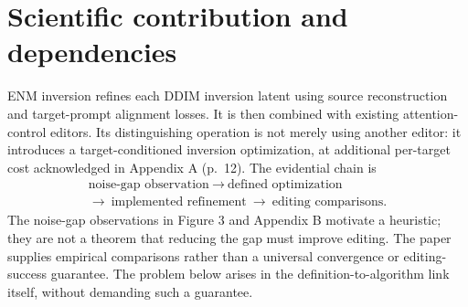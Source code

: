 \documentclass[10pt]{article}
\begin{document}
\section*{Scientific contribution and dependencies}
ENM inversion refines each DDIM inversion latent using source reconstruction and target-prompt alignment losses. It is then combined with existing attention-control editors. Its distinguishing operation is not merely using another editor: it introduces a target-conditioned inversion optimization, at additional per-target cost acknowledged in Appendix A (p. 12). The evidential chain is \[\begin{gathered}
\text{noise-gap observation}\ \longrightarrow\ \text{defined optimization}\\
\longrightarrow\ \text{implemented refinement}\ \longrightarrow\ \text{editing comparisons}.
\end{gathered}\] The noise-gap observations in Figure 3 and Appendix B motivate a heuristic; they are not a theorem that reducing the gap must improve editing. The paper supplies empirical comparisons rather than a universal convergence or editing-success guarantee. The problem below arises in the definition-to-algorithm link itself, without demanding such a guarantee.\par
\end{document}
